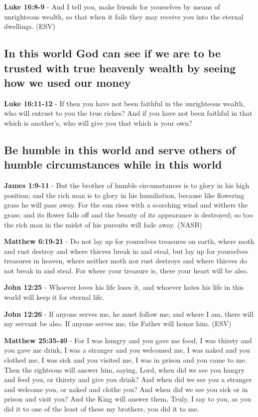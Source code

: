 \documentclass[11pt]{article}
\begin{document}
\textbf{Luke 16:8-9} - And I tell you, make friends for yourselves by means of unrighteous wealth, so that when it fails they may receive you into the eternal dwellings. (ESV)

\subsection{In this world God can see if we are to be trusted with true heavenly wealth by seeing how we used our money}
\label{sec:org37e8cb5}
\textbf{Luke 16:11-12} - If then you have not been faithful in the unrighteous wealth, who will entrust to you the true riches? And if you have not been faithful in that which is another's, who will give you that which is your own?

\subsection{Be humble in this world and serve others of humble circumstances while in this world}
\label{sec:org749bf46}
\textbf{James 1:9-11} - But the brother of humble circumstances is to glory in his high position; and the rich man is to glory in his humiliation, because like flowering grass he will pass away. For the sun rises with a scorching wind and withers the grass; and its flower falls off and the beauty of its appearance is destroyed; so too the rich man in the midst of his pursuits will fade away. (NASB)

\textbf{Matthew 6:19-21} - Do not lay up for yourselves treasures on earth, where moth and rust destroy and where thieves break in and steal, but lay up for yourselves treasures in heaven, where neither moth nor rust destroys and where thieves do not break in and steal. For where your treasure is, there your heart will be also.

\textbf{John 12:25} - Whoever loves his life loses it, and whoever hates his life in this world will keep it for eternal life.

\textbf{John 12:26} - If anyone serves me, he must follow me; and where I am, there will my servant be also. If anyone serves me, the Father will honor him. (ESV)

\textbf{Matthew 25:35-40} - For I was hungry and you gave me food, I was thirsty and you gave me drink, I was a stranger and you welcomed me, I was naked and you clothed me, I was sick and you visited me, I was in prison and you came to me. Then the righteous will answer him, saying, Lord, when did we see you hungry and feed you, or thirsty and give you drink? And when did we see you a stranger and welcome you, or naked and clothe you? And when did we see you sick or in prison and visit you? And the King will answer them, Truly, I say to you, as you did it to one of the least of these my brothers, you did it to me.
\end{document}
